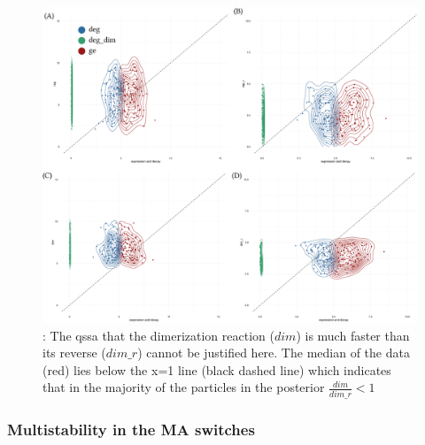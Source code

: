 \begin{figure}[htbp]
\begin{center}
\includegraphics[width=\textwidth]{../../chapters/chapterStabilityFinder/images/qssa-cs-sym.png}
\caption[Testing the QSSA assumptions on the mass action models]{ \label{fig:ma_qssa}: The \acrshort{qssa} that the dimerization reaction ($dim$) is much faster than its reverse ($dim\_r$) cannot be justified here. The median of the data (red) lies below the x=1 line (black dashed line) which indicates that in the majority of the particles in the posterior $\frac{dim}{dim\_r} < 1$}
\end{center}
\end{figure}
\clearpage



\subsubsection{Multistability in the MA switches}

